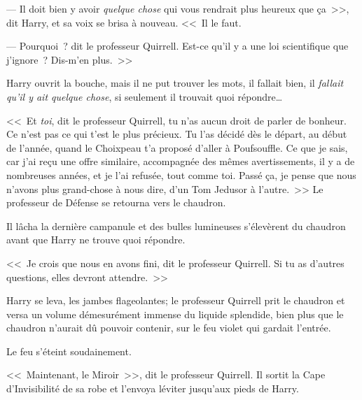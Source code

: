--- Il doit bien y avoir \emph{quelque chose} qui vous rendrait plus heureux que ça~>>, dit Harry, et sa voix se brisa à nouveau. <<~Il le faut.

--- Pourquoi~? dit le professeur Quirrell. Est-ce qu'il y a une loi scientifique que j'ignore~? Dis-m'en plus.~>>

Harry ouvrit la bouche, mais il ne put trouver les mots, il fallait bien, il \emph{fallait qu'il y ait quelque chose}, si seulement il trouvait quoi répondre…

<<~Et \emph{toi}, dit le professeur Quirrell, tu n'as aucun droit de parler de bonheur. Ce n'est pas ce qui t'est le plus précieux. Tu l'as décidé dès le départ, au début de l'année, quand le Choixpeau t'a proposé d'aller à Poufsouffle. Ce que je sais, car j'ai reçu une offre similaire, accompagnée des mêmes avertissements, il y a de nombreuses années, et je l'ai refusée, tout comme toi. Passé ça, je pense que nous n'avons plus grand-chose à nous dire, d'un Tom Jedusor à l'autre.~>> Le professeur de Défense se retourna vers le chaudron.

Il lâcha la dernière campanule et des bulles lumineuses s'élevèrent du chaudron avant que Harry ne trouve quoi répondre.

<<~Je crois que nous en avons fini, dit le professeur Quirrell. Si tu as d'autres questions, elles devront attendre.~>>

Harry se leva, les jambes flageolantes; le professeur Quirrell prit le chaudron et versa un volume démesurément immense du liquide splendide, bien plus que le chaudron n'aurait dû pouvoir contenir, sur le feu violet qui gardait l'entrée.

Le feu s'éteint soudainement.

<<~Maintenant, le Miroir~>>, dit le professeur Quirrell. Il sortit la Cape d'Invisibilité de sa robe et l'envoya léviter jusqu'aux pieds de Harry.
